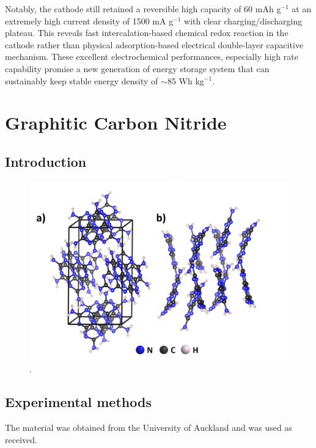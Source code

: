 Notably, the cathode still retained a reversible high capacity of 60 mAh g$^{-1}$ at an extremely high current density of 1500 mA g$^{-1}$ with clear charging/discharging plateau. This reveals fast intercalation-based chemical redox reaction in the  cathode rather than physical adsorption-based electrical double-layer capacitive mechanism. These excellent electrochemical performances, especially high rate capability promise a new generation of energy storage system that can sustainably keep stable energy density of $\sim$85 Wh kg$^{-1}$.


\section{Graphitic Carbon Nitride}

\subsection{Introduction}

\begin{figure}[th!]
\centering
\includegraphics[width=\textwidth]{Figures/chap6fig/C3N4crys}
\caption{.}
\label{Figures/chap6fig:C3N4crys}
\end{figure}
\subsection{Experimental methods}
The material was obtained from the University of Auckland and was used as received. 


